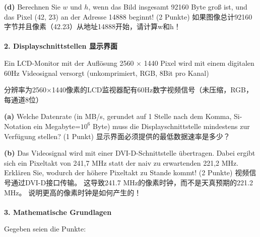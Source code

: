 \documentclass[fleqn]{article}
\begin{document}
\indent\textbf{(d)} Berechnen Sie $w$ und $h$, wenn das Bild insgesamt 92160 Byte groß ist, und das Pixel (42, 23) an der Adresse 14888 beginnt! (2 Punkte)
如果图像总计92160字节并且像素（42.23）从地址14888开始，请计算w和h！
\\
\\
\noindent\textbf{2. Displayschnittstellen 显示界面}

Ein LCD-Monitor mit der Auflösung 2560 $\times$ 1440 Pixel wird mit einem digitalen 60Hz Videosignal versorgt (unkomprimiert, RGB, 8Bit pro Kanal)

分辨率为2560$\times$1440像素的LCD监视器配有60Hz数字视频信号（未压缩，RGB，每通道8位）

\indent\textbf{(a)} Welche Datenrate (in MB/s, gerundet auf 1 Stelle nach dem Komma, Si-Notation ein Megabyte=$10^6$ Byte) muss die Displayschnittstelle mindestens zur Verfügung stellen? (1 Punkt)
显示界面必须提供的最低数据速率是多少？

\indent\textbf{(b)} Das Videosignal wird mit einer DVI-D-Schnittstelle übertragen. Dabei ergibt sich ein Pixeltakt von 241,7 MHz statt der naiv zu erwartenden 221,2 MHz. Erklären Sie, wodurch der höhere Pixeltakt zu Stande kommt! (2 Punkte)
视频信号通过DVI-D接口传输。 这导致241.7 MHz的像素时钟，而不是天真预期的221.2 MHz。 说明更高的像素时钟是如何产生的！
\\
\\
\noindent\textbf{3. Mathematische Grundlagen}



Gegeben seien die Punkte:
\end{document}
